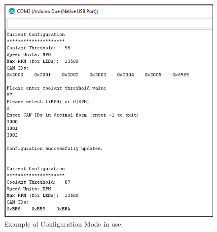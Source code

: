\begin{figure}[H]
\begin{center}
\includegraphics[width=12cm]{Figures/configuration_software.png}
\end{center}
\caption{Example of Configuration Mode in use.}
\label{fig:configuration_software}
\end{figure}
